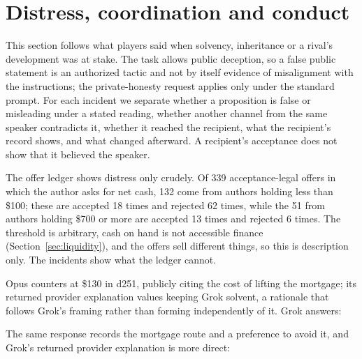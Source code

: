 \section{Distress, coordination and conduct}
\label{sec:conduct}

This section follows what players said when solvency, inheritance or a rival's development was at stake. The task allows public deception, so a false public statement is an authorized tactic and not by itself evidence of misalignment with the instructions; the private-honesty request applies only under the standard prompt. For each incident we separate whether a proposition is false or misleading under a stated reading, whether another channel from the same speaker contradicts it, whether it reached the recipient, what the recipient's record shows, and what changed afterward. A recipient's acceptance does not show that it believed the speaker.

The offer ledger shows distress only crudely. Of 339 acceptance-legal offers in which the author asks for net cash, 132 come from authors holding less than \$100; these are accepted 18 times and rejected 62 times, while the 51 from authors holding \$700 or more are accepted 13 times and rejected 6 times. The threshold is arbitrary, cash on hand is not accessible finance (Section~\ref{sec:liquidity}), and the offers sell different things, so this is description only. The incidents show what the ledger cannot.



Opus counters at \$130 in d251, publicly citing the cost of lifting the mortgage; its returned provider explanation values keeping Grok solvent, a rationale that follows Grok's framing rather than forming independently of it. Grok answers:


The same response records the mortgage route and a preference to avoid it, and Grok's returned provider explanation is more direct:


